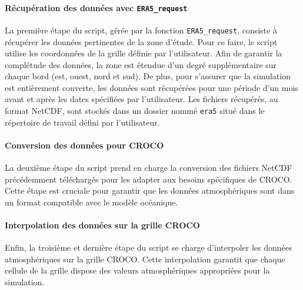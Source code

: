 \paragraph{Récupération des données avec \texttt{ERA5\_request}\\}
La première étape du script, gérée par la fonction \texttt{ERA5\_request}, consiste à récupérer les données pertinentes de la zone d'étude. Pour ce faire, le script utilise les coordonnées de la grille définie par l'utilisateur. Afin de garantir la complétude des données, la zone est étendue d'un degré supplémentaire sur chaque bord (est, ouest, nord et sud). De plus, pour s'assurer que la simulation est entièrement couverte, les données sont récupérées pour une période d'un mois avant et après les dates spécifiées par l'utilisateur. Les fichiers récupérés, au format NetCDF, sont stockés dans un dossier nommé \texttt{era5} situé dans le répertoire de travail défini par l'utilisateur.

\paragraph{Conversion des données pour CROCO\\}
La deuxième étape du script prend en charge la conversion des fichiers NetCDF précédemment téléchargés pour les adapter aux besoins spécifiques de CROCO. Cette étape est cruciale pour garantir que les données atmosphériques sont dans un format compatible avec le modèle océanique.

\paragraph{Interpolation des données sur la grille CROCO\\}

Enfin, la troisième et dernière étape du script se charge d'interpoler les données atmosphériques sur la grille CROCO. Cette interpolation garantit que chaque cellule de la grille dispose des valeurs atmosphériques appropriées pour la simulation.

